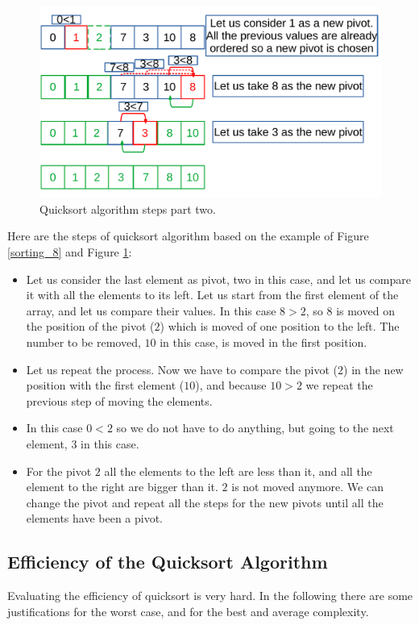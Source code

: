 \begin{figure}[H]
	\begin{center}
		\includegraphics[scale=.6]{chapters/searchandsorting/images/sorting_9.pdf}
		\caption[Quicksort algorithm steps part two.]{Quicksort algorithm steps part two.}
		\label{sorting_9}
	\end{center}
\end{figure}

Here are the steps of quicksort algorithm based on the example of Figure \ref{sorting_8} and Figure \ref{sorting_9}:
\begin{itemize}
\item[1] Let us consider the last element as pivot, two in this case, and let us compare it with all the elements to its left. Let us start from the first element of the array, and let us compare their values. In this case \(8 > 2\), so \(8\) is moved on the position of the pivot (\(2\)) which is moved of one position to the left. The number to be removed, \(10\) in this case, is moved in the first position.
\item[2] Let us repeat the process. Now we have to compare the pivot (\(2\)) in the new position with the first element (\(10\)), and because \(10>2\) we repeat the previous step of moving the elements.
\item[3] In this case \(0<2\) so we do not have to do anything, but going to the next element, \(3\) in this case.
\item[4] For the pivot \(2\) all the elements to the left are less than it, and all the element to the right are bigger than it. \(2\) is not moved anymore. We can change the pivot and repeat all the steps for the new pivots until all the elements have been a pivot.
\end{itemize}

\subsection{Efficiency of the Quicksort Algorithm}
Evaluating the efficiency of quicksort is very hard. In the following there are some justifications for the worst case, and for the best and average complexity.

